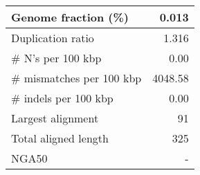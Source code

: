 \documentclass[12pt,a4paper]{article}
\begin{document}
\begin{table}[ht]
\begin{center}
\begin{tabular}{|l*{1}{|r}|}
Genome fraction (\%) & 0.013 \\ \hline
Duplication ratio & 1.316 \\ \hline
\# N's per 100 kbp & 0.00 \\ \hline
\# mismatches per 100 kbp & 4048.58 \\ \hline
\# indels per 100 kbp & 0.00 \\ \hline
Largest alignment & 91 \\ \hline
Total aligned length & 325 \\ \hline
NGA50 & - \\ \hline
\end{tabular}
\end{center}
\end{table}
\end{document}
